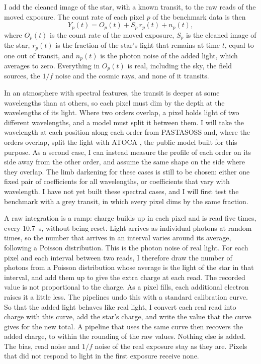 I add the cleaned image of the star, with a known transit, to the raw reads of
the moved exposure. The count rate of each pixel $p$ of the benchmark data
is then
\begin{equation}
  Y_p(t) = O_p(t) + S_p\,r_p(t) + n_p(t),
  \label{eq:4476}
\end{equation}
where $O_p(t)$ is the count rate of the moved exposure, $S_p$ is the cleaned
image of the star, $r_p(t)$ is the fraction of the star's light that remains
at time $t$, equal to one out of transit, and $n_p(t)$ is the photon noise of
the added light, which averages to zero. Everything in $O_p(t)$ is real,
including the sky, the field sources, the $1/f$ noise and the cosmic rays,
and none of it transits.

In an atmosphere with spectral features, the transit is deeper at some
wavelengths than at others, so each pixel must dim by the depth at the
wavelengths of its light. Where two orders overlap, a pixel holds light of two
different wavelengths, and a model must split it between them. I will take the wavelength at each position along each order from PASTASOSS
\citep{BainesEtAl2023Wavelength} and, where the orders overlap, split the
light with ATOCA \citep{DarveauBernierEtAl2022}, the public model built for this
purpose. As a second case, I can instead measure the profile of each order on
its side away from the other order, and assume the same shape on the side
where they overlap. The limb darkening for these cases is still to be chosen:
either one fixed pair of coefficients for all wavelengths, or coefficients that vary with wavelength. I have not yet built these spectral cases, and I will first test the benchmark with a grey transit, in which every pixel dims by the same fraction.

A raw integration is a ramp: charge builds up in each pixel and is read five
times, every 10.7~s, without being reset. Light arrives as individual photons
at random times, so the number that arrives in an interval varies around its
average, following a Poisson distribution. This is the photon noise of real
light. For each pixel and each interval between two reads, I therefore draw
the number of photons from a Poisson distribution whose average is the light
of the star in that interval, and add them up to give the extra charge at each
read. The recorded value is not proportional to the charge. As a pixel fills,
each additional electron raises it a little less. The
pipelines undo this with a standard calibration curve. So that the added light
behaves like real light, I convert each real read into charge with this curve,
add the star's charge, and write the value that the curve gives for the new
total. A pipeline that uses the same curve then recovers the added charge, to
within the rounding of the raw values. Nothing else is added. The bias, read
noise and $1/f$ noise of the real exposure stay as they are. Pixels that did
not respond to light in the first exposure receive none.

